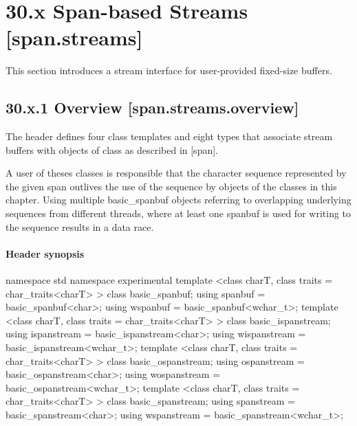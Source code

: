 \documentclass[ebook,11pt,article]{memoir}
\begin{document}
\section{30.x Span-based Streams [span.streams]}
This section introduces a stream interface for user-provided fixed-size buffers. 
\subsection{30.x.1 Overview [span.streams.overview]}
The header  defines four class templates and eight types that associate stream buffers with objects of class  as described in [span]. 
\begin{note}
A user of theses classes is responsible that the character sequence represented by the given span outlives the use of the sequence by objects of the classes in this chapter. Using multiple basic_spanbuf objects referring to overlapping underlying sequences from different threads, where at least one spanbuf is used for writing to the sequence results in a data race.
\end{note}

\paragraph{Header  synopsis}

\begin{codeblock}
namespace std {
namespace experimental {
  template <class charT, class traits = char_traits<charT> >
    class basic_spanbuf;
  using spanbuf = basic_spanbuf<char>;
  using wspanbuf = basic_spanbuf<wchar_t>;
  template <class charT, class traits = char_traits<charT> >
    class basic_ispanstream;
  using ispanstream = basic_ispanstream<char>;
  using wispanstream = basic_ispanstream<wchar_t>;
  template <class charT, class traits = char_traits<charT> >
    class basic_ospanstream;
  using ospanstream = basic_ospanstream<char>;
  using wospanstream = basic_ospanstream<wchar_t>;
  template <class charT, class traits = char_traits<charT> >
    class basic_spanstream;
  using spanstream = basic_spanstream<char>;
  using wspanstream = basic_spanstream<wchar_t>;
}}
\end{codeblock}
\end{document}
